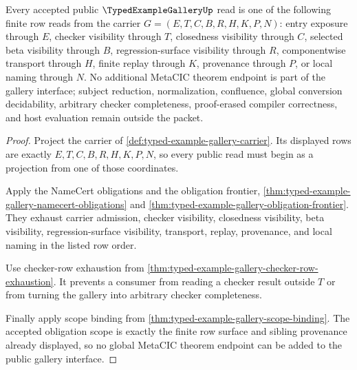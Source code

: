 \begin{theorem}
\label{thm:typed-example-gallery-scope-kernel-rows-complete}
Every accepted public $\TypedExampleGalleryUp$ read is one of the following finite row reads from the carrier $G=(E,T,C,B,R,H,K,P,N)$: entry exposure through $E$, checker visibility through $T$, closedness visibility through $C$, selected beta visibility through $B$, regression-surface visibility through $R$, componentwise transport through $H$, finite replay through $K$, provenance through $P$, or local naming through $N$. No additional MetaCIC theorem endpoint is part of the gallery interface; subject reduction, normalization, confluence, global conversion decidability, arbitrary checker completeness, proof-erased compiler correctness, and host evaluation remain outside the packet.
\end{theorem}
\begin{proof}
Project the carrier of \autoref{def:typed-example-gallery-carrier}. Its displayed rows are exactly $E,T,C,B,R,H,K,P,N$, so every public read must begin as a projection from one of those coordinates.

Apply the NameCert obligations and the obligation frontier, \autoref{thm:typed-example-gallery-namecert-obligations} and \autoref{thm:typed-example-gallery-obligation-frontier}. They exhaust carrier admission, checker visibility, closedness visibility, beta visibility, regression-surface visibility, transport, replay, provenance, and local naming in the listed row order.

Use checker-row exhaustion from \autoref{thm:typed-example-gallery-checker-row-exhaustion}. It prevents a consumer from reading a checker result outside $T$ or from turning the gallery into arbitrary checker completeness.

Finally apply scope binding from \autoref{thm:typed-example-gallery-scope-binding}. The accepted obligation scope is exactly the finite row surface and sibling provenance already displayed, so no global MetaCIC theorem endpoint can be added to the public gallery interface.
\end{proof}

